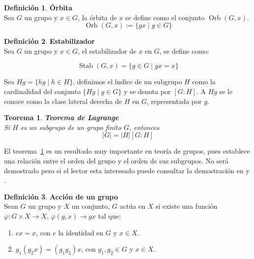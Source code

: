 \documentclass[11pt]{book}
\newtheorem{theorem}{Teorema}
\theoremstyle{definition}
\newtheorem{definition}{Definición}
\DeclareMathOperator{\Stab}{Stab}
\DeclareMathOperator{\orb}{Orb}
\begin{document}
\begin{definition}\textbf{Órbita}\\
  Sea $G$ un grupo y $x\in G$, la órbita de $x$ se define como el
  conjunto $\orb (G,x)$.
  \begin{equation*}
    \orb(G,x):=\{ gx \mid g\in G \}
  \end{equation*}
\end{definition}

\begin{definition}\textbf{Estabilizador}\\
  Sea $G$ un grupo y $x\in G$, el estabilizador de $x$ en $G$, se define
  como:

\begin{equation*}
  \Stab (G,x)=\{ g\in G \mid gx=x \}
\end{equation*}
\end{definition}

Sea $Hg=\{hg \mid h\in H\}$, definimos el índice de un subgrupo $H$ como la cardinalidad del conjunto $\{Hg
\mid g\in G \}$ y se denota por $[G:H]$. A $Hg$ se le conoce como la
clase lateral derecha de $H$ en $G$, representada por $g$.


\begin{theorem}\textbf{Teorema de Lagrange}\\
  Si $H$ es un subgrupo de un grupo finito $G$, entonces
$$|G|=|H|[G:H]$$
\label{TeoLagrange}
\end{theorem}

El teorema~\ref{TeoLagrange} es un resultado muy importante en teoría
de grupos, pues establece una relación entre el orden del grupo y el
orden de sus subgrupos. No ser\'a demostrado pero si el lector esta
interesado puede consultar la demostración en \cite{Barrera} y \cite{Ehrlich}.


\begin{definition}\textbf{Acción de un grupo}\\
  Sean $G$ un grupo y $X$ un conjunto, $G$ actúa en $X$ si existe una
  función $\varphi: G \times X \rightarrow X$, $\varphi (g,x)
  \rightarrow gx$ tal que:

  \begin{enumerate}
  \item $ex=x$, con $e$ la identidad en $G$ y $x\in X$.

  \item $g_1(g_2x)=(g_1g_2)x$, con $g_1,g_2 \in G$ y $x\in X$.
  \end{enumerate}
\end{definition}
\end{document}
